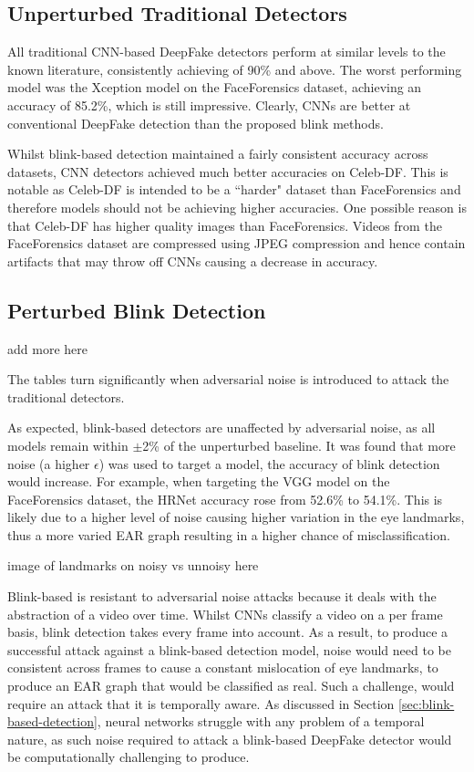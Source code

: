 \subsection{Unperturbed Traditional Detectors}
\label{sec:un-trad-detect}

All traditional CNN-based DeepFake detectors perform at similar levels to the known literature, consistently achieving of 90\% and above. The worst performing model was the Xception model on the FaceForensics dataset, achieving an accuracy of 85.2\%, which is still impressive. Clearly, CNNs are better at conventional DeepFake detection than the proposed blink methods. 

Whilst blink-based detection maintained a fairly consistent accuracy across datasets, CNN detectors achieved much better accuracies on Celeb-DF. This is notable as Celeb-DF is intended to be a ``harder" dataset than FaceForensics\cite{li2020celeb} and therefore models should not be achieving higher accuracies. One possible reason is that Celeb-DF has higher quality images than FaceForensics. Videos from the FaceForensics dataset are compressed using JPEG compression\cite{roessler2018faceforensics} and hence contain artifacts that may throw off CNNs causing a decrease in accuracy.

\subsection{Perturbed Blink Detection}

{\huge add more here}

The tables turn significantly when adversarial noise is introduced to attack the traditional detectors. 

As expected, blink-based detectors are unaffected by adversarial noise, as all models remain within $\pm$2\% of the unperturbed baseline. It was found that more noise (a higher $\epsilon$) was used to target a model, the accuracy of blink detection would increase. For example, when targeting the VGG model on the FaceForensics dataset, the HRNet accuracy rose from 52.6\% to 54.1\%. This is likely due to a higher level of noise causing higher variation in the eye landmarks, thus a more varied EAR graph resulting in a higher chance of misclassification.

{\huge image of landmarks on noisy vs unnoisy here}

Blink-based is resistant to adversarial noise attacks because it deals with the abstraction of a video over time. Whilst CNNs classify a video on a per frame basis, blink detection takes every frame into account. As a result, to produce a successful attack against a blink-based detection model, noise would need to be consistent across frames to cause a constant mislocation of eye landmarks, to produce an EAR graph that would be classified as real. Such a challenge, would require an attack that it is temporally aware. As discussed in Section \ref{sec:blink-based-detection}, neural networks struggle with any problem of a temporal nature, as such noise required to attack a blink-based DeepFake detector would be computationally challenging to produce.

